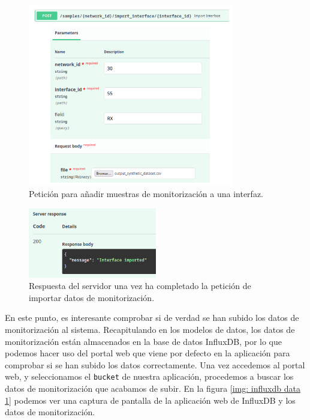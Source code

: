\documentclass[a4paper, oneside, 12pt]{book}
\begin{document}
	\begin{figure}[h!]
		\begin{center}
			\includegraphics[width=0.8\textwidth]{diag/request_import_if.png}
			\caption{Petición para añadir muestras de monitorización a una interfaz.}
			\label{img: request import if (validate)}
		\end{center}
	\end{figure}
	
	\pagebreak
	
	\begin{figure}[h!]
		\begin{center}
			\includegraphics[width=0.5\textwidth]{img/response_import_if.png}
			\caption{Respuesta del servidor una vez ha completado la petición de importar datos de monitorización.}
			\label{img: response import if (validate)}
		\end{center}
	\end{figure}

	\noindent En este punto, es interesante comprobar si de verdad se han subido los datos de monitorización al sistema. Recapitulando en los modelos de datos, los datos de monitorización están almacenados en la base de datos InfluxDB, por lo que podemos hacer uso del portal web que viene por defecto en la aplicación para comprobar si se han subido los datos correctamente. Una vez accedemos al portal web, y seleccionamos el \texttt{bucket} de nuestra aplicación, procedemos a buscar los datos de monitorización que acabamos de subir. En la figura \ref{img: influxdb data 1} podemos ver una captura de pantalla de la aplicación web de InfluxDB y los datos de monitorización.
	
\end{document}
